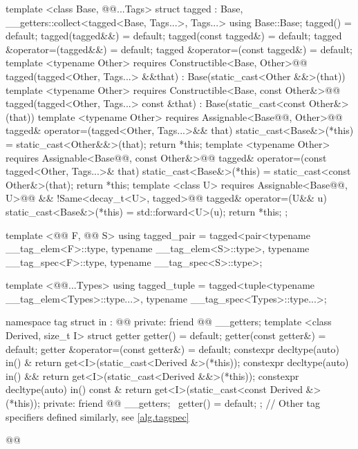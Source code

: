 \begin{codeblock}
{  template <class Base, @@...Tags>
  struct tagged
    : Base, __getters::collect<tagged<Base, Tags...>, Tags...> {
    using Base::Base;
    tagged() = default;
    tagged(tagged&&) = default;
    tagged(const tagged&) = default;
    tagged &operator=(tagged&&) = default;
    tagged &operator=(const tagged&) = default;
    template <typename Other>
      requires Constructible<Base, Other>@\newtxt{()}@
    tagged(tagged<Other, Tags...> &&that)
      : Base(static_cast<Other &&>(that)) { }
    template <typename Other>
      requires Constructible<Base, const Other&>@\newtxt{()}@
    tagged(tagged<Other, Tags...> const &that)
      : Base(static_cast<const Other&>(that)) { }
    template <typename Other>
      requires Assignable<Base@\newtxt{\&}@, Other>@\newtxt{()}@
    tagged& operator=(tagged<Other, Tags...>&& that) {
      static_cast<Base&>(*this) = static_cast<Other&&>(that);
      return *this;
    }
    template <typename Other>
      requires Assignable<Base@\newtxt{\&}@, const Other&>@\newtxt{()}@
    tagged& operator=(const tagged<Other, Tags...>& that) {
      static_cast<Base&>(*this) = static_cast<const Other&>(that);
      return *this;
    }
    template <class U>
      requires Assignable<Base@\newtxt{\&}@, U>@\newtxt{()}@ && !Same<decay_t<U>, tagged>@\newtxt{()}@
    tagged& operator=(U&& u) {
      static_cast<Base&>(*this) = std::forward<U>(u);
      return *this;
    }
  };

  template <@@ F, @@ S>
  using tagged_pair =
    tagged<pair<typename __tag_elem<F>::type, typename __tag_elem<S>::type>,
           typename __tag_spec<F>::type, typename __tag_spec<S>::type>;

  template <@@...Types>
  using tagged_tuple =
    tagged<tuple<typename __tag_elem<Types>::type...>,
           typename __tag_spec<Types>::type...>;

  namespace tag {
    struct in : @@ {
    private:
      friend @@ __getters;
      template <class Derived, size_t I>
      struct getter {
        getter() = default;
        getter(const getter&) = default;
        getter &operator=(const getter&) = default;
        constexpr decltype(auto) in() & {
          return get<I>(static_cast<Derived &>(*this));
        }
        constexpr decltype(auto) in() && {
          return get<I>(static_cast<Derived &&>(*this));
        }
        constexpr decltype(auto) in() const & {
          return get<I>(static_cast<const Derived &>(*this));
        }
      private:
        friend @@ __getters;
        ~getter() = default;
      };
    }
    // Other tag specifiers defined similarly, see \ref{alg.tagspec}
  }
}@\newtxt{\}\}\}}@
\end{codeblock}
